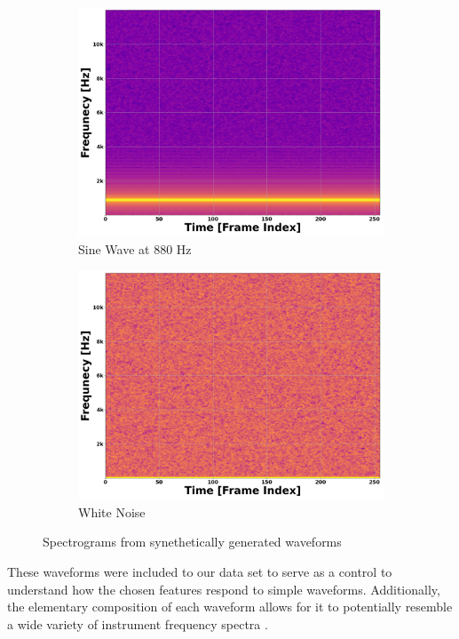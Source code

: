 \documentclass[12pt,letterpaper]{article}
\begin{document}
\begin{figure}[H]
	\begin{subfigure}{0.45\textwidth}
	\centering
	\includegraphics[scale=0.2]{../FiguresSpectrogram/SineWave-880Hz}
	\caption{Sine Wave at $880$ Hz}
	\end{subfigure}
	\begin{subfigure}{0.45\textwidth}
	\centering
	\includegraphics[scale=0.2]{../FiguresSpectrogram/WhiteNoise-190}
	\caption{White Noise}
	\end{subfigure}
\caption{Spectrograms from synethetically generated waveforms}	
\label{fig-PropertiesSynths}
\end{figure}

These waveforms were included to our data set to serve as a control to understand how the chosen features respond to simple waveforms. Additionally, the elementary composition of each waveform allows for it to potentially resemble a wide variety of instrument frequency spectra \cite{White}.
\end{document}
